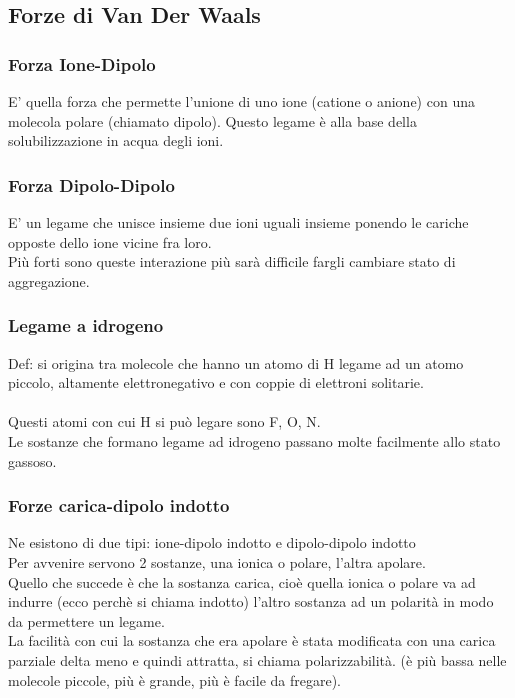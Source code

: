 \subsection{Forze di Van Der Waals}
\subsubsection{Forza Ione-Dipolo}
E' quella forza che permette l'unione di uno ione (catione o anione) con una molecola polare (chiamato dipolo). Questo legame è alla base della solubilizzazione in acqua degli ioni.
\subsubsection{Forza Dipolo-Dipolo}
E' un legame che unisce insieme due ioni uguali insieme ponendo le cariche opposte dello ione vicine fra loro.\\
Più forti sono queste interazione più sarà difficile fargli cambiare stato di aggregazione.
\subsubsection{Legame a idrogeno}
Def: si origina tra molecole che hanno un atomo di H legame ad un atomo piccolo, altamente elettronegativo e con coppie di elettroni solitarie.\\\\
Questi atomi con cui H si può legare sono F, O, N.\\
Le sostanze che formano legame ad idrogeno passano molte facilmente allo stato gassoso.
\subsubsection{Forze carica-dipolo indotto}
Ne esistono di due tipi: ione-dipolo indotto e dipolo-dipolo indotto\\
Per avvenire servono 2 sostanze, una ionica o polare, l’altra apolare.\\ 
Quello che succede è che la sostanza carica, cioè quella ionica o polare va ad indurre (ecco perchè si chiama indotto) l’altro sostanza ad un polarità in modo da permettere un legame. \\
La facilità con cui la sostanza che era apolare è stata modificata con una carica parziale delta meno e quindi attratta, si chiama polarizzabilità. (è più bassa nelle molecole piccole, più è grande, più è facile da fregare).
